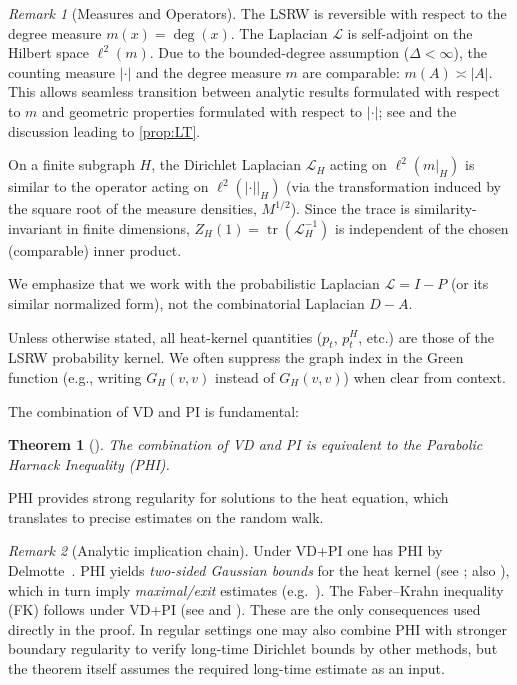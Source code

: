 \documentclass[reqno]{amsart}
\numberwithin{equation}{section}
\newtheorem{theorem}{Theorem}[section]
\theoremstyle{definition}
\theoremstyle{remark}
\newtheorem{remark}[remark]{Remark}
\newcommand{\Cref}[1]{\autoref{#1}}
\DeclareMathOperator{\tr}{tr}
\newcommand{\LL}{\mathcal{L}}
\begin{document}
\begin{remark}[Measures and Operators]\label{rem:measures_operators}
The LSRW is reversible with respect to the degree measure $m(x)=\deg(x)$. The Laplacian $\LL$ is self-adjoint on the Hilbert space $\ell^2(m)$. Due to the bounded-degree assumption ($\Delta < \infty$), the counting measure $|\cdot|$ and the degree measure $m$ are comparable: $m(A) \asymp |A|$. This allows seamless transition between analytic results formulated with respect to $m$ and geometric properties formulated with respect to $|\cdot|$; see \cite{Coulhon03} and the discussion leading to \Cref{prop:LT}.


On a finite subgraph $H$, the Dirichlet Laplacian $\LL_H$ acting on $\ell^2(m|_H)$ is similar to the operator acting on $\ell^2(|\cdot||_H)$ (via the transformation induced by the square root of the measure densities, $M^{1/2}$). Since the trace is similarity-invariant in finite dimensions, $Z_H(1) = \tr(\LL_H^{-1})$ is independent of the chosen (comparable) inner product.


We emphasize that we work with the probabilistic Laplacian $\LL=I-P$ (or its similar normalized form), not the combinatorial Laplacian $D-A$.


Unless otherwise stated, all heat-kernel quantities ($p_t$, $p_t^H$, etc.) are those of the LSRW probability kernel. We often suppress the graph index in the Green function (e.g., writing $G_H(v,v)$ instead of $G_{H}(v,v)$) when clear from context.
\end{remark}

The combination of VD and PI is fundamental:

\begin{theorem}[\cite{Delmotte99}]\label{thm:Delmotte}
The combination of VD and PI is equivalent to the Parabolic Harnack Inequality (PHI).
\end{theorem}

PHI provides strong regularity for solutions to the heat equation, which translates to precise estimates on the random walk.

\begin{remark}[Analytic implication chain]\label{rem:chain}
Under VD+PI one has PHI by Delmotte~\cite{Delmotte99}. PHI yields \emph{two-sided Gaussian bounds} for the heat kernel (see \cite{Delmotte99}; also \cite[§5.3]{Grigoryan09}), which in turn imply
\emph{maximal/exit} estimates (e.g.\ \cite[Thm.~5.5.3]{Grigoryan09}). The Faber–Krahn inequality (FK) follows under VD+PI (see \cite[Ch.~8]{Grigoryan09} and \cite{BarlowBass04}). These are the only consequences used directly in the proof. In regular settings one may also combine PHI with stronger boundary regularity to verify long-time Dirichlet bounds by other methods, but the theorem itself assumes the required long-time estimate as an input.
\end{remark}
\end{document}
